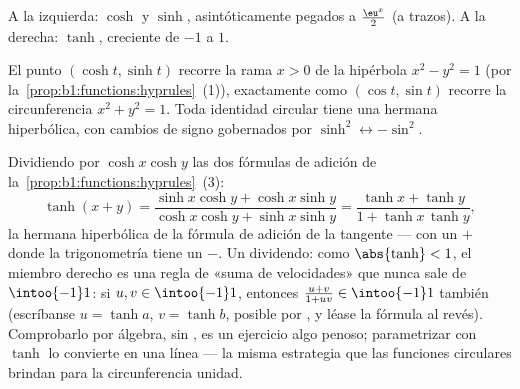 \begin{omfigure}

{\small A la izquierda: $\cosh$ y $\sinh$, asintóticamente pegados a
$\frac{\eu^x}{2}$ (a trazos). A la derecha: $\tanh$, creciente de $-1$
a $1$.}
\end{omfigure}

\begin{remark}
El punto $(\cosh t, \sinh t)$ recorre la rama $x > 0$ de la hipérbola
$x^2 - y^2 = 1$ (por la~\cref{prop:b1:functions:hyprules}~(1)),
exactamente como $(\cos t, \sin t)$ recorre la circunferencia
$x^2 + y^2 = 1$. Toda identidad circular tiene una hermana
hiperbólica, con cambios de signo gobernados por
$\sinh^2 \leftrightarrow -\sin^2$.
\end{remark}

\begin{example}\label{ex:b1:functions:tanhadd}
Dividiendo por $\cosh x\cosh y$ las dos fórmulas de adición de
la~\cref{prop:b1:functions:hyprules}~(3):
\[
\tanh(x + y)
= \frac{\sinh x\cosh y + \cosh x\sinh y}
{\cosh x\cosh y + \sinh x\sinh y}
= \frac{\tanh x + \tanh y}{1 + \tanh x\,\tanh y} ,
\]
la hermana hiperbólica de la fórmula de adición de la tangente --- con
un $+$ donde la trigonometría tiene un $-$. Un dividendo: como
$\abs{\tanh} < 1$, el miembro derecho es una regla de «suma de
velocidades» que nunca sale de $\intoo{-1}1$: si $u, v \in \intoo{-1}1$,
entonces $\frac{u + v}{1 + uv} \in \intoo{-1}1$ también (escríbanse
$u = \tanh a$, $v = \tanh b$, posible por , y léase la
fórmula al revés). Comprobarlo por álgebra, sin , es un ejercicio algo penoso; parametrizar con $\tanh$ lo
convierte en una línea --- la misma estrategia que las funciones
circulares brindan para la circunferencia unidad.
\end{example}

